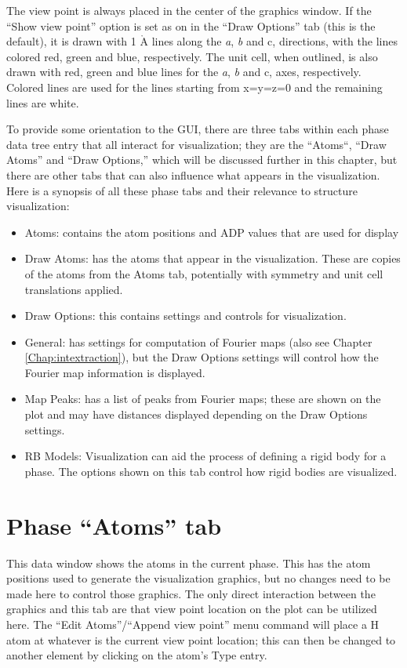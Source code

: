 The view point is always placed in the center of the graphics window. If the ``Show view point'' option is set as on in the ``Draw Options'' tab (this is the default), it is drawn with 1 $\mathring{\text{A}}$ lines along the \textit{a}, \textit{b} and c, directions, with the lines colored red, green and blue, respectively. The unit cell, when outlined, is also drawn with red, green and blue lines for the \textit{a}, \textit{b} and c,  axes, respectively. Colored lines are used for the lines starting from x=y=z=0  and the remaining lines are white.

To provide some orientation to the GUI, there are three tabs within each phase data tree entry that all interact for visualization; they are the ``Atoms``, ``Draw Atoms'' and ``Draw Options,'' which will be discussed further in this chapter, but there are other tabs that can also influence what appears in the visualization. Here is a synopsis of all these phase tabs and their relevance to structure visualization:
\begin{itemize}
    \item Atoms: contains the atom positions and ADP values that are used for display
    \item  Draw Atoms: has the atoms that appear in the visualization. These are copies of the atoms from the Atoms tab, potentially with symmetry and unit cell translations applied.
    \item Draw Options: this contains settings and controls for visualization. 
    \item General: has settings for computation of Fourier maps (also see Chapter \ref{Chap:intextraction}), but the Draw Options settings will control how the Fourier map information is displayed.
    \item Map Peaks: has a list of peaks from Fourier maps; these are shown on the plot and may have distances displayed depending on the Draw Options settings.
    \item RB Models: Visualization can aid the process of defining a rigid body for a phase. The options shown on this tab control how rigid bodies are visualized. 
\end{itemize}

\section{Phase ``Atoms'' tab}
This data window shows the atoms in the current phase. This has the atom positions used to generate the visualization graphics, but no changes need to be made here to control those graphics. The only direct interaction between the graphics and this tab are that view point location on the plot can be utilized here. The ``Edit Atoms''/``Append view point'' menu command will place a H atom at whatever is the current view point location; this can then be changed to another element by clicking on the atom's Type entry. 

